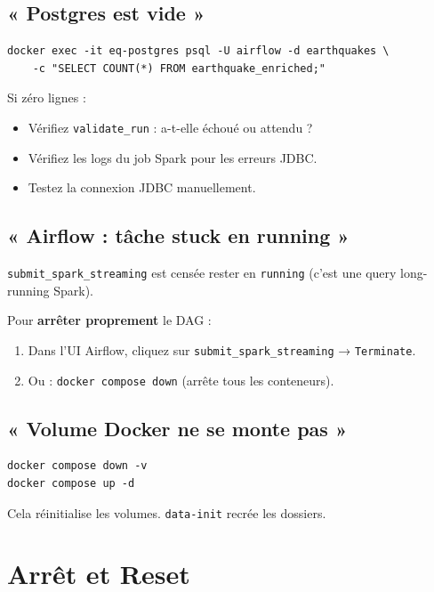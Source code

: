\documentclass[12pt, a4paper]{article}
\begin{document}
\subsection{« Postgres est vide »}

\begin{lstlisting}
docker exec -it eq-postgres psql -U airflow -d earthquakes \
    -c "SELECT COUNT(*) FROM earthquake_enriched;"
\end{lstlisting}

Si zéro lignes :
\begin{itemize}
  \item Vérifiez \texttt{validate\_run} : a-t-elle échoué ou attendu ?
  \item Vérifiez les logs du job Spark pour les erreurs JDBC.
  \item Testez la connexion JDBC manuellement.
\end{itemize}

\subsection{« Airflow : tâche stuck en running »}

\texttt{submit\_spark\_streaming} est censée rester en \texttt{running} (c'est une query long-running Spark).

Pour \textbf{arrêter proprement} le DAG :
\begin{enumerate}
  \item Dans l'UI Airflow, cliquez sur \texttt{submit\_spark\_streaming} → \texttt{Terminate}.
  \item Ou : \texttt{docker compose down} (arrête tous les conteneurs).
\end{enumerate}

\subsection{« Volume Docker ne se monte pas »}

\begin{lstlisting}
docker compose down -v
docker compose up -d
\end{lstlisting}

Cela réinitialise les volumes. \texttt{data-init} recrée les dossiers.

\section{Arrêt et Reset}
\end{document}
